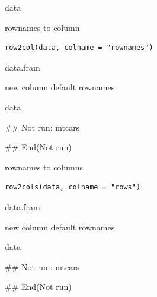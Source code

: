 \documentclass[a4paper]{book}
\begin{document}
%
\begin{Value}
data
\end{Value}
%
\begin{Description}
rownames to column
\end{Description}
%
\begin{Usage}
\begin{verbatim}
row2col(data, colname = "rownames")
\end{verbatim}
\end{Usage}
%
\begin{Arguments}
\begin{ldescription}
\item[\code{data}] data.fram

\item[\code{colname}] new column default rownames
\end{ldescription}
\end{Arguments}
%
\begin{Value}
data
\end{Value}
%
\begin{Examples}
\begin{ExampleCode}

\#\# Not run: 
mtcars %

## End(Not run)

\end{ExampleCode}
\end{Examples}
%
\begin{Description}
rownames to columns
\end{Description}
%
\begin{Usage}
\begin{verbatim}
row2cols(data, colname = "rows")
\end{verbatim}
\end{Usage}
%
\begin{Arguments}
\begin{ldescription}
\item[\code{data}] data.fram

\item[\code{colname}] new column default rownames
\end{ldescription}
\end{Arguments}
%
\begin{Value}
data
\end{Value}
%
\begin{Examples}
\begin{ExampleCode}

\#\# Not run: 
mtcars %

## End(Not run)

\end{ExampleCode}
\end{Examples}
\end{document}
